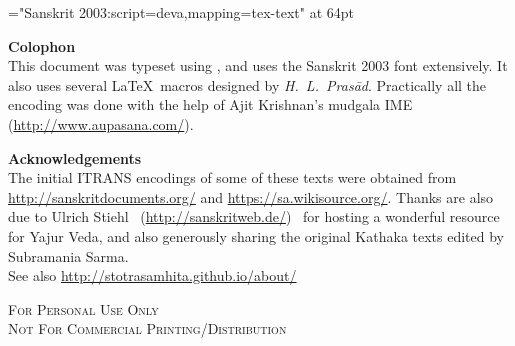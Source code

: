 \thispagestyle{empty}\clearpage
\begin{titlepage}
\vspace*{6.5cm}
\begin{center}
{\font\x="Sanskrit 2003:script=deva,mapping=tex-text" at 64pt \x \titletext}
\end{center}
\end{titlepage}

\begin{center}
\parbox{10cm}{
{\Large \textbf{Colophon}}\\
\noindent This document was typeset using \XeLaTeX, and uses the Sanskrit 2003 font extensively. It also uses several \LaTeX\ macros designed by \textit{H.~L.~Prasād}. Practically all the encoding was done with the help of Ajit Krishnan's mudgala IME (\url{http://www.aupasana.com/}).
\vspace*{3cm}

{\large \textbf{Acknowledgements}}\\
The initial ITRANS encodings of some of these texts were obtained from \url{http://sanskritdocuments.org/} and \url{https://sa.wikisource.org/}. Thanks are also due to Ulrich Stiehl~ (\url{http://sanskritweb.de/}) ~for hosting a wonderful resource for Yajur Veda, and also generously sharing the original Kathaka texts edited by Subramania Sarma. \\
See also \url{http://stotrasamhita.github.io/about/}
\vspace*{1cm}
%
\begin{center}
{\scshape{For Personal Use Only\\
 Not For Commercial Printing/Distribution}}
\end{center}
}
\end{center}
\clearemptydoublepage %
\setcounter{page}{0} %
\renewcommand{\chaptermark}[1]{%
\markboth{\large #1}{}} %
\begin{large}
\tableofcontents
\end{large}

\mbox{}
\clearpage
\thispagestyle{empty}
\clearemptydoublepage
